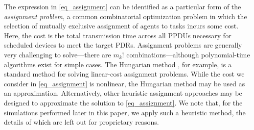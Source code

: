 The expression in \eqref{eq_assignment} can be identified as a particular form of the \emph{assignment problem}, a common combinatorial optimization problem in which the selection of mutually exclusive assignment of agents to tasks incurs some cost. Here, the cost is the total transmission time across all PPDUs necessary for scheduled devices to meet the target PDRs. Assignment problems are generally very challenging to solve---there are $m_k!$ combinations---although polynomial-time algorithms exist for simple cases. The Hungarian method \cite{kuhn1955hungarian}, for example, is a standard method for solving linear-cost assignment problems. While the cost we consider in \eqref{eq_assignment} is nonlinear, the Hungarian method may be used as an approximation. Alternatively, other heuristic assignment approaches may be designed to approximate the solution to \eqref{eq_assignment}. We note that, for the simulations performed later in this paper, we apply such a heuristic method, the details of which are left out for proprietary reasons.
